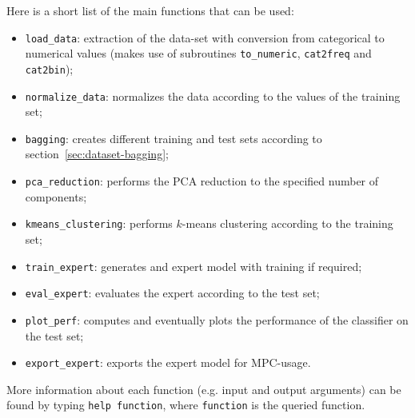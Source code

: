 Here is a short list of the main functions that can be used:
\begin{itemize}
    \item \verb=load_data=: extraction of the data-set with conversion from categorical to numerical values (makes use of subroutines \verb=to_numeric=, \verb=cat2freq= and \verb=cat2bin=);
    \item \verb=normalize_data=: normalizes the data according to the values of the training set;
    \item \verb=bagging=: creates different training and test sets according to section~\ref{sec:dataset-bagging};
    \item \verb=pca_reduction=: performs the PCA reduction to the specified number of components;
    \item \verb=kmeans_clustering=: performs $k$-means clustering according to the training set;
    \item \verb=train_expert=: generates and expert model with training if required;
    \item \verb=eval_expert=: evaluates the expert according to the test set;
    \item \verb=plot_perf=: computes and eventually plots the performance of the classifier on the test set;
    \item \verb=export_expert=: exports the expert model for MPC-usage.
\end{itemize}

More information about each function (e.g. input and output arguments) can be found by typing \verb=help function=, where \verb=function= is the queried function.

